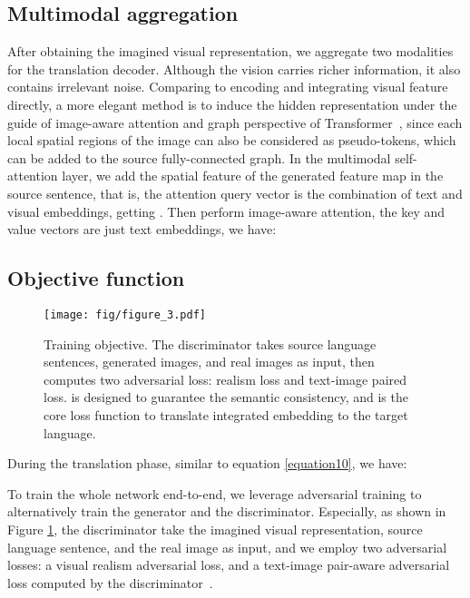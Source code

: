 \documentclass[11pt]{article}
\begin{document}
\subsection{Multimodal aggregation}

After obtaining the imagined visual representation, we aggregate two modalities for the translation decoder. Although the vision carries richer information, it also contains irrelevant noise. Comparing to encoding and integrating visual feature directly, a more elegant method is to induce the hidden representation under the guide of image-aware attention and graph perspective of Transformer~\cite{yao2020multimodal}, since each local spatial regions of the image can also be considered as pseudo-tokens, which can be added to the source fully-connected graph. In the multimodal self-attention layer, we add the spatial feature of the generated feature map in the source sentence, that is, the attention query vector is the combination of text and visual embeddings, getting . Then perform image-aware attention, the key and value vectors are just text embeddings, we have:





\subsection{Objective function}

\begin{figure}[t]
\centering
\texttt{[image: fig/figure\_3.pdf]} \caption{Training objective. The discriminator takes source language sentences, generated images, and real images as input, then computes two adversarial loss: realism loss and text-image paired loss.  is designed to guarantee the semantic consistency, and  is the core loss function to translate integrated embedding to the target language.}
\label{fig3}
\end{figure}

During the translation phase, similar to equation \ref{equation10}, we have:



To train the whole network end-to-end, we leverage adversarial training to alternatively train the generator and the discriminator. Especially, as shown in Figure \ref{fig3}, the discriminator take the imagined visual representation, source language sentence, and the real image as input, and we employ two adversarial losses: a visual realism adversarial loss, and a text-image pair-aware adversarial loss computed by the discriminator~\cite{zhang2017stackgan,xu2018attngan,qiao2019mirrorgan}. 
\end{document}
